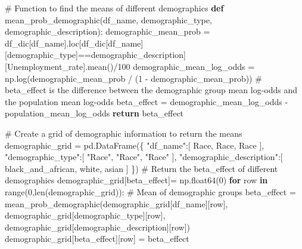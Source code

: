 \documentclass[
]{agujournal2019}
\newenvironment{Shaded}{\begin{snugshade}}{\end{snugshade}}
\newcommand{\BuiltInTok}[1]{\textcolor[rgb]{0.00,0.23,0.31}{#1}}
\newcommand{\CommentTok}[1]{\textcolor[rgb]{0.37,0.37,0.37}{#1}}
\newcommand{\ControlFlowTok}[1]{\textcolor[rgb]{0.00,0.23,0.31}{\textbf{#1}}}
\newcommand{\DecValTok}[1]{\textcolor[rgb]{0.68,0.00,0.00}{#1}}
\newcommand{\KeywordTok}[1]{\textcolor[rgb]{0.00,0.23,0.31}{\textbf{#1}}}
\newcommand{\NormalTok}[1]{\textcolor[rgb]{0.00,0.23,0.31}{#1}}
\newcommand{\OperatorTok}[1]{\textcolor[rgb]{0.37,0.37,0.37}{#1}}
\newcommand{\StringTok}[1]{\textcolor[rgb]{0.13,0.47,0.30}{#1}}
\begin{document}
\begin{Shaded}
\begin{Highlighting}[]
\CommentTok{\# Function to find the means of different demographics}
\KeywordTok{def}\NormalTok{ mean\_prob\_demographic(df\_name, demographic\_type, demographic\_description):}
\NormalTok{    demographic\_mean\_prob }\OperatorTok{=}\NormalTok{ df\_dic[df\_name].loc[df\_dic[df\_name][demographic\_type]}\OperatorTok{==}\NormalTok{demographic\_description][}\StringTok{\textquotesingle{}Unemployment\_rate\textquotesingle{}}\NormalTok{].mean()}\OperatorTok{/}\DecValTok{100}
\NormalTok{    demographic\_mean\_log\_odds }\OperatorTok{=}\NormalTok{ np.log(demographic\_mean\_prob }\OperatorTok{/}\NormalTok{ (}\DecValTok{1} \OperatorTok{{-}}\NormalTok{ demographic\_mean\_prob))}
    \CommentTok{\# beta\_effect is the difference between the demographic group mean log{-}odds and the population mean log{-}odds}
\NormalTok{    beta\_effect }\OperatorTok{=}\NormalTok{ demographic\_mean\_log\_odds }\OperatorTok{{-}}\NormalTok{ population\_mean\_log\_odds}
    \ControlFlowTok{return}\NormalTok{ beta\_effect}

\CommentTok{\# Create a grid of demographic information to return the means}
\NormalTok{demographic\_grid }\OperatorTok{=}\NormalTok{ pd.DataFrame(\{}
    \StringTok{"df\_name"}\NormalTok{:[}
        \StringTok{\textquotesingle{}Race\textquotesingle{}}\NormalTok{,}
        \StringTok{\textquotesingle{}Race\textquotesingle{}}\NormalTok{,}
        \StringTok{\textquotesingle{}Race\textquotesingle{}}
\NormalTok{    ],}
    \StringTok{"demographic\_type"}\NormalTok{:[}
        \StringTok{"Race"}\NormalTok{, }
        \StringTok{"Race"}\NormalTok{,}
        \StringTok{"Race"}
\NormalTok{    ],}
    \StringTok{"demographic\_description"}\NormalTok{:[}
        \StringTok{\textquotesingle{}black\_and\_african\textquotesingle{}}\NormalTok{,}
        \StringTok{\textquotesingle{}white\textquotesingle{}}\NormalTok{,}
        \StringTok{\textquotesingle{}asian\textquotesingle{}}
\NormalTok{    ]}
\NormalTok{\})}
\CommentTok{\# Return the beta\_effect of different demographics}
\NormalTok{demographic\_grid[}\StringTok{\textquotesingle{}beta\_effect\textquotesingle{}}\NormalTok{]}\OperatorTok{=}\NormalTok{ np.float64(}\DecValTok{0}\NormalTok{)}
\ControlFlowTok{for}\NormalTok{ row }\KeywordTok{in} \BuiltInTok{range}\NormalTok{(}\DecValTok{0}\NormalTok{,}\BuiltInTok{len}\NormalTok{(demographic\_grid)):}
    \CommentTok{\# Mean of demographic groups}
\NormalTok{    beta\_effect }\OperatorTok{=}\NormalTok{ mean\_prob\_demographic(demographic\_grid[}\StringTok{\textquotesingle{}df\_name\textquotesingle{}}\NormalTok{][row], demographic\_grid[}\StringTok{\textquotesingle{}demographic\_type\textquotesingle{}}\NormalTok{][row], demographic\_grid[}\StringTok{\textquotesingle{}demographic\_description\textquotesingle{}}\NormalTok{][row])}
\NormalTok{    demographic\_grid[}\StringTok{\textquotesingle{}beta\_effect\textquotesingle{}}\NormalTok{][row] }\OperatorTok{=}\NormalTok{ beta\_effect}
\end{Highlighting}
\end{Shaded}
\end{document}
